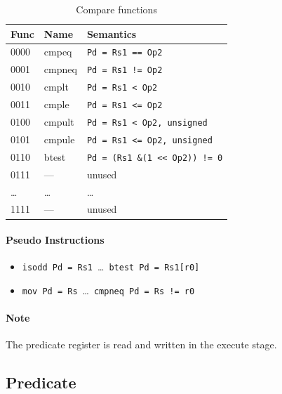 \documentclass[a4paper,fontsize=10pt,twoside,DIV15,BCOR12mm,headinclude=true,footinclude=false,pagesize,bibtotoc]{scrbook}
\newcommand{\comment}[3]{

\textsf{\textbf{#1}} {\color{#3}#2}}
\newcommand{\stefan}[1]{\comment{Stefan}{#1}{RoyalPurple}}
\renewcommand{\stefan}[1]{}
\newcommand{\AND}{\&\xspace}
\newcommand{\shl}{\textless$\!$\textless\xspace}
\begin{document}
\begin{table}[hb]
  \centering
  \begin{tabular}{lll}
    \toprule
    Func & Name   & Semantics \\
    \midrule
    0000 & cmpeq  & \texttt{Pd = Rs1 ==  Op2} \\
    0001 & cmpneq & \texttt{Pd = Rs1 !=  Op2} \\
    0010 & cmplt  & \texttt{Pd = Rs1 \textless\ Op2} \\
    0011 & cmple  & \texttt{Pd = Rs1 \textless= Op2} \\
    0100 & cmpult & \texttt{Pd = Rs1 \textless\ Op2, unsigned} \\
    0101 & cmpule & \texttt{Pd = Rs1 \textless= Op2, unsigned} \\
    0110 & btest  & \texttt{Pd = (Rs1 \AND (1 \shl Op2)) != 0} \\
    0111 & ---    & unused \\
    \dots& \dots  & \dots \\
    1111 & ---    & unused \\
    \bottomrule
  \end{tabular}
  \caption{Compare functions}
  \label{tab:cmpfunc}
\end{table}

\paragraph{Pseudo Instructions}
\begin{itemize}
  \item \texttt{isodd Pd = Rs1}~\dots~\texttt{btest Pd = Rs1[r0]}
  \item \texttt{mov Pd = Rs}~\dots~\texttt{cmpneq Pd = Rs != r0}
\end{itemize}

\paragraph{Note}

The predicate register is read and written in the execute stage.

\stefan{We discussed about adding short immediate versions, but with the current predicate handling this is not
a trivial change for the compiler, so we skip that. Instead, we might introduce bez/bnez instructions, which is much more common anyway.}

\clearpage
\subsection{Predicate}
\end{document}

